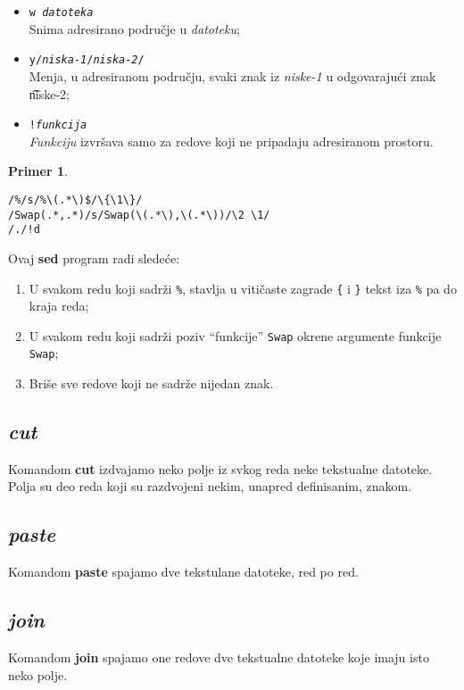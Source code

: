 \documentclass[12pt,a4paper]{article}
\newtheorem{primer}{Primer}[section]
\begin{document}
\begin{itemize}
        {\it Zastavica} mo\v ze biti broj (tada se vr\v si menjanje samo na
        tom mestu) ili slovo {\tt g} (tada se vr\v se sve zamene)
      \item
        {\tt w {\it datoteka}}\\
        Snima adresirano podru\v cje u {\it datoteku};
      \item
        {\tt y/{\it niska-1}/{\it niska-2}/}\\
        Menja, u adresiranom podru\v cju, svaki znak iz {\it niske-1} u
        odgovaraju\'ci znak {\t niske-2};
      \item
        {\tt!{\it funkcija}}\\
        {\it Funkciju} izvr\v sava samo za redove koji ne pripadaju
        adresiranom pro\-storu.
      \end{itemize}

      \begin{primer}\ \label{primer:sed}\end{primer}
      \begin{verbatim}
/%/s/%\(.*\)$/\{\1\}/
/Swap(.*,.*)/s/Swap(\(.*\),\(.*\))/\2 \1/
/./!d
\end{verbatim}

      Ovaj {\bf sed} program radi slede\'ce:
      \begin{enumerate}
      \item
        U svakom redu koji sadr\v zi {\tt\%}, stavlja u viti\v caste zagrade
        {\tt\{} i {\tt\}} tekst iza {\tt\%} pa do kraja reda;
      \item
        U svakom redu koji sadr\v zi poziv ``funkcije'' {\tt Swap} okrene
        argumente funkcije {\tt Swap};
      \item
        Bri\v se sve redove koji ne sadr\v ze nijedan znak.
      \end{enumerate}
%
    \subsection{\em cut}
      Komandom {\bf cut} izdvajamo neko polje iz svkog reda neke tekstualne
      datoteke.
      Polja su deo reda koji su razdvojeni nekim, unapred definisanim, znakom.
%
    \subsection{\em paste}
      Komandom {\bf paste} spajamo dve tekstulane datoteke, red po red.
%
    \subsection{\em join}
      Komandom {\bf join} spajamo one redove dve tekstualne datoteke koje
      imaju isto neko polje.
%
%
  \newpage
\end{document}
